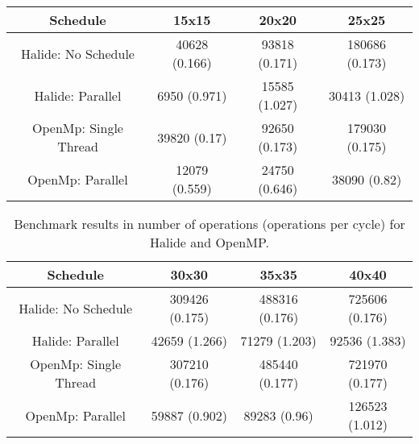 \begin{table}[ht]
\begin{center}
\begin{tabular}{|c||c|c|c|}
\hline
Schedule& 15x15& 20x20& 25x25\\ 
\hline
\hline
Halide: No Schedule& 40628 (0.166)& 93818 (0.171)& 180686 (0.173)\\ 
\hline
Halide: Parallel& 6950 (0.971)& 15585 (1.027)& 30413 (1.028)\\ 
\hline
OpenMp: Single Thread& 39820 (0.17)& 92650 (0.173)& 179030 (0.175)\\ 
\hline
OpenMp: Parallel& 12079 (0.559)& 24750 (0.646)& 38090 (0.82)\\ 
\hline

\end{tabular}
\end{center}
\end{table}


\begin{table}[ht]
\begin{center}
\begin{tabular}{|c||c|c|c|}
\hline
Schedule& 30x30& 35x35& 40x40\\ 
\hline
\hline
Halide: No Schedule& 309426 (0.175)& 488316 (0.176)& 725606 (0.176)\\ 
\hline
Halide: Parallel& 42659 (1.266)& 71279 (1.203)& 92536 (1.383)\\ 
\hline
OpenMp: Single Thread& 307210 (0.176)& 485440 (0.177)& 721970 (0.177)\\ 
\hline
OpenMp: Parallel & 59887 (0.902)& 89283 (0.96)& 126523 (1.012)\\ 
\hline

\end{tabular}
\end{center}
	\caption{Benchmark results in number of operations (operations per cycle) for Halide and OpenMP.}
	\label{Table:BenchmarksHalideOpenMP}
\end{table}

